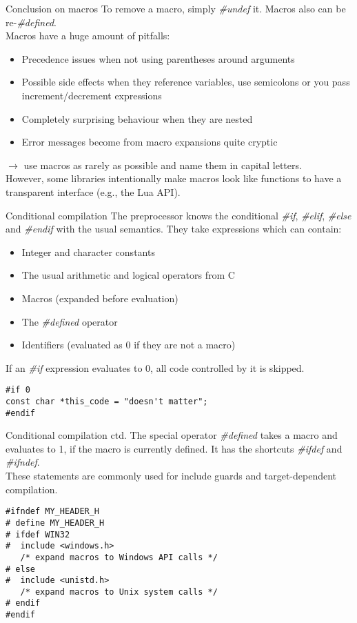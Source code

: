 \begin{frame}[fragile]{Conclusion on macros}
	To remove a macro, simply \textit{\#undef} it. Macros also can be re-\textit{\#defined}.\\
	\bigskip
	Macros have a huge amount of pitfalls:
	\begin{itemize}
		\item Precedence issues when not using parentheses around arguments
		\item Possible side effects when they reference variables, use semicolons
			  or you pass increment/decrement expressions
		\item Completely surprising behaviour when they are nested
		\item Error messages become from macro expansions quite cryptic
	\end{itemize}
	\bigskip
	$\rightarrow$ use macros as rarely as possible and name them in capital letters.\\
	\bigskip
	However, some libraries intentionally make macros look like functions to have a transparent
	interface (e.g., the Lua API).
\end{frame}

\begin{frame}[fragile]{Conditional compilation}
	The preprocessor knows the conditional \textit{\#if}, \textit{\#elif}, \textit{\#else}
	and \textit{\#endif} with the usual semantics. They take expressions which can contain:
	\begin{itemize}
		\item Integer and character constants
		\item The usual arithmetic and logical operators from C
		\item Macros (expanded before evaluation)
		\item The \textit{\#defined} operator
		\item Identifiers (evaluated as 0 if they are not a macro)
	\end{itemize}
	\bigskip
	If an \textit{\#if} expression evaluates to 0, all code controlled by it is skipped.
	\begin{lstlisting}[numbers=none]
#if 0
const char *this_code = "doesn't matter";
#endif
\end{lstlisting}
\end{frame}

\begin{frame}[fragile]{Conditional compilation ctd.}
	The special operator \textit{\#defined} takes a macro and evaluates to 1, if the macro
	is currently defined. It has the shortcuts \textit{\#ifdef} and \textit{\#ifndef}.\\
	\bigskip
	These statements are commonly used for include guards and target-dependent compilation.
	\begin{lstlisting}[numbers=none]
#ifndef MY_HEADER_H
# define MY_HEADER_H
# ifdef WIN32
#  include <windows.h>
   /* expand macros to Windows API calls */
# else
#  include <unistd.h>
   /* expand macros to Unix system calls */
# endif
#endif
\end{lstlisting}
\end{frame}

